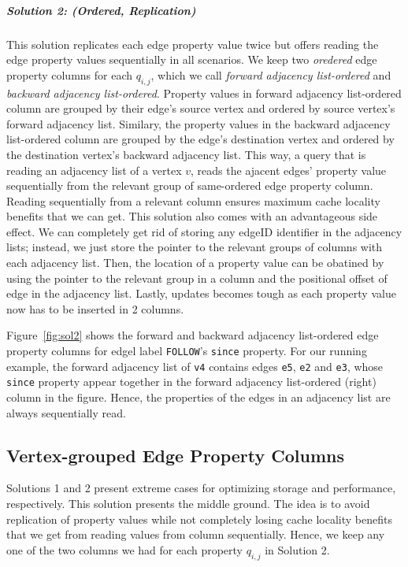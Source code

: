\subparagraph{Solution 2: (Ordered, Replication) } This solution replicates each edge property value twice but offers reading the edge property values sequentially in all scenarios. We keep two \emph{oredered} edge property columns for each $q_{i,j}$, which we call \emph{forward adjacency list-ordered} and \emph{backward adjacency list-ordered}. Property values in forward adjacency list-ordered column are grouped by their edge's source vertex and ordered by source vertex's forward adjacency list. Similary, the property values in the backward adjacency list-ordered column are grouped by the edge's destination vertex and ordered by the destination vertex's backward adjacency list. This way, a query that is reading an adjacency list of a vertex $v$, reads the ajacent edges' property value sequentially from the relevant group of same-ordered edge property column. Reading sequentially from a relevant column ensures maximum cache locality benefits that we can get. This solution also comes with an advantageous side effect. We can completely get rid of storing any edgeID identifier in the adjacency lists; instead, we just store the pointer to the relevant groups of columns with each adjacency list. Then, the location of a property value can be obatined by using the pointer to the relevant group in a column and the positional offset of edge in the adjacency list. Lastly, updates becomes tough as each property value now has to be inserted in 2 columns.

Figure~\ref{fig:sol2} shows the forward and backward adjacency list-ordered edge property columns for edgel label \texttt{FOLLOW}'s \texttt{since} property. For our running example, the forward adjacency list of \texttt{v4} contains edges \texttt{e5}, \texttt{e2} and \texttt{e3}, whose \texttt{since} property appear together in the forward adjacency list-ordered (right) column in the figure. Hence, the properties of the edges in an adjacency list are always sequentially read.

\subsection{Vertex-grouped Edge Property Columns}

Solutions 1 and 2 present extreme cases for optimizing storage and performance, respectively. This solution presents the middle ground. The idea is to avoid replication of property values while not completely losing cache locality benefits that we get from reading values from column sequentially. Hence, we keep any one of the two columns we had for each property $q_{i,j}$ in Solution 2.

